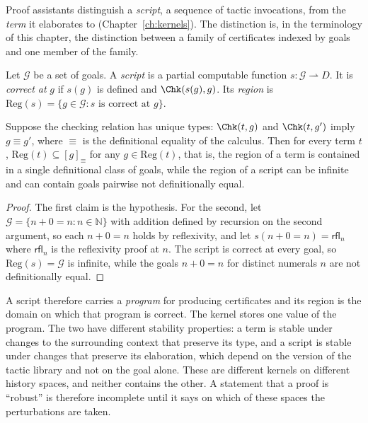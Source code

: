 Proof assistants distinguish a \emph{script}, a sequence of tactic invocations, from the \emph{term} it elaborates to (Chapter~\ref{ch:kernels}). The distinction is, in the terminology of this chapter, the distinction between a family of certificates indexed by goals and one member of the family.

\begin{definition}[Script]
\label{def:script}
Let $\mathcal G$ be a set of goals. A \emph{script} is a partial computable function $s:\mathcal G\rightharpoonup D$. It is \emph{correct at} $g$ if $s(g)$ is defined and $\Chk(s(g),g)$. Its \emph{region} is $\mathrm{Reg}(s)=\{g\in\mathcal G:s\text{ is correct at }g\}$.
\end{definition}

\begin{proposition}
\label{prop:terms-points}
Suppose the checking relation has unique types: $\Chk(t,g)$ and $\Chk(t,g')$ imply $g\equiv g'$, where $\equiv$ is the definitional equality of the calculus. Then for every term $t$, $\mathrm{Reg}(t)\subseteq[g]_\equiv$ for any $g\in\mathrm{Reg}(t)$, that is, the region of a term is contained in a single definitional class of goals, while the region of a script can be infinite and can contain goals pairwise not definitionally equal.
\end{proposition}

\begin{proof}
The first claim is the hypothesis. For the second, let $\mathcal G=\{n+0=n:n\in\mathbb{N}\}$ with addition defined by recursion on the second argument, so each $n+0=n$ holds by reflexivity, and let $s(n+0=n)=\mathsf{rfl}_n$ where $\mathsf{rfl}_n$ is the reflexivity proof at $n$. The script is correct at every goal, so $\mathrm{Reg}(s)=\mathcal G$ is infinite, while the goals $n+0=n$ for distinct numerals $n$ are not definitionally equal.
\end{proof}

A script therefore carries a \emph{program} for producing certificates and its region is the domain on which that program is correct. The kernel stores one value of the program. The two have different stability properties: a term is stable under changes to the surrounding context that preserve its type, and a script is stable under changes that preserve its elaboration, which depend on the version of the tactic library and not on the goal alone. These are different kernels on different history spaces, and neither contains the other. A statement that a proof is ``robust'' is therefore incomplete until it says on which of these spaces the perturbations are taken.


